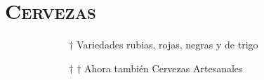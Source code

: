 \section{\textsc{\textbf{Cervezas}}} %


$ \>  \>  \>  \>  \>  \>  \>  \>  \>  \>  \>  \>  \>  \>  \>  \>  \>  \>  \>  \>  \>  \>  \>  \>  \>  \>  \>  \>  $ $\dag$ 
Variedades rubias, rojas, negras y de trigo

$ \>  \>  \>  \>  \>  \>  \>  \>  \>  \>  \>  \>  \>  \>  \>  \>  \>  \>  \>  \>  \>  \>  \>  \>  \>  \>  \>  \>  $ $\dag$ $\dag$
Ahora también Cervezas Artesanales 
